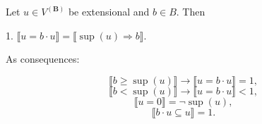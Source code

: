 Let $u \in V^{(\mathbf{B})}$ be extensional and $b \in B$. Then

1. $\llbracket u = b \cdot u \rrbracket = \llbracket \sup(u) \Rightarrow b \rrbracket$.

As consequences:

$$\llbracket b \geq \sup(u) \rrbracket \rightarrow \llbracket u = b \cdot u \rrbracket = 1,$$
$$\llbracket b < \sup(u) \rrbracket \rightarrow \llbracket u = b \cdot u \rrbracket < 1,$$
$$\llbracket u = 0 \rrbracket = \neg \sup(u),$$
$$\llbracket b \cdot u \subseteq u \rrbracket = 1.$$
